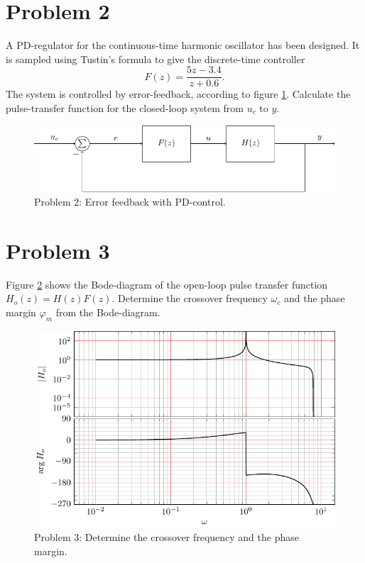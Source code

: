 \documentclass{scrartcl}
\begin{document}
\section*{Problem 2}
\label{sec-2}

A PD-regulator for the continuous-time harmonic oscillator has been designed. It is sampled using Tustin's formula to give the discrete-time controller
\begin{equation}
F(z) = \frac{5z-3.4}{z+0.6}.
\end{equation}
The system is controlled by error-feedback, according to figure \ref{fig:error-feedback}. Calculate the pulse-transfer function for the closed-loop system from $u_c$ to $y$.
\begin{figure}[h]
\begin{center}
\includegraphics[]{error-feedback}
\caption{Problem 2: Error feedback with PD-control.}
\label{fig:error-feedback}
\end{center}
\end{figure}
\section*{Problem 3}
\label{sec-3}

Figure \ref{fig:bode-open} shows the Bode-diagram of the open-loop pulse transfer function $H_o(z) = H(z)F(z)$. Determine the crossover frequency $\omega_c$ and the phase margin $\varphi_m$ from the Bode-diagram.
\begin{figure}[h]
\begin{center}
\includegraphics[]{bode-open}
\caption{Problem 3: Determine the crossover frequency and the phase margin.}
\label{fig:bode-open}
\end{center}
\end{figure}
\end{document}
